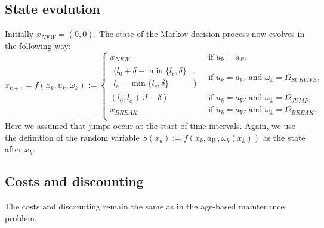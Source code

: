 \subsection{State evolution}
Initially $x_{NEW}=(0,0)$.
The state of the Markov decision process now evolves in the following way:
\[
x_{k+1}=f(x_k, u_k, \omega_k):=\begin{cases}
x_{NEW}&\ \text{if }u_k=a_R,\\
\begin{split}(l_0+\delta-\min\{l_c,\delta\}&,\\l_c-\min\{l_c,\delta\}&)\end{split}&\ \text{if }u_k=a_W\text{ and }\omega_k=\Omega_{SURVIVE},\\
(l_0,l_c+J-\delta)&\ \text{if }u_k=a_W\text{ and }\omega_k=\Omega_{JUMP},\\
x_{BREAK}&\ \text{if }u_k=a_W\text{ and }\omega_k=\Omega_{BREAK}.\\
\end{cases}
\]
Here we assumed that jumps occur at the start of time intervals.
Again, we use the definition of the random variable $S(x_k):=f(x_k,a_W,\omega_k(x_k))$ as the state after $x_k$.

\subsection{Costs and discounting}
The costs and discounting remain the same as in the age-based maintenance problem.

